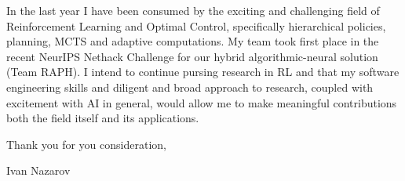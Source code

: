 \documentclass[14pt]{letter}
\begin{document}
In the last year I have been consumed by the exciting and challenging field of Reinforcement
Learning and Optimal Control, specifically hierarchical policies, planning, MCTS and adaptive
computations. My team took first place in the recent NeurIPS Nethack Challenge for our hybrid
algorithmic-neural solution (Team RAPH). I intend to continue pursing research in RL and 
 that my software engineering skills and diligent and broad approach to research, coupled
 with excitement with AI in general, would allow me to make meaningful contributions both
 the field itself and its applications. \par\medskip


\hfill Thank you for you consideration,\par%
\hfill Ivan Nazarov
\end{document}
